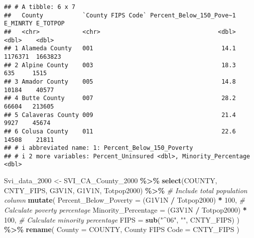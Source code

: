 \documentclass[
]{article}
\newenvironment{Shaded}{\begin{snugshade}}{\end{snugshade}}
\newcommand{\AttributeTok}[1]{\textcolor[rgb]{0.13,0.29,0.53}{#1}}
\newcommand{\CommentTok}[1]{\textcolor[rgb]{0.56,0.35,0.01}{\textit{#1}}}
\newcommand{\DecValTok}[1]{\textcolor[rgb]{0.00,0.00,0.81}{#1}}
\newcommand{\FunctionTok}[1]{\textcolor[rgb]{0.13,0.29,0.53}{\textbf{#1}}}
\newcommand{\NormalTok}[1]{#1}
\newcommand{\OtherTok}[1]{\textcolor[rgb]{0.56,0.35,0.01}{#1}}
\newcommand{\SpecialCharTok}[1]{\textcolor[rgb]{0.81,0.36,0.00}{\textbf{#1}}}
\newcommand{\StringTok}[1]{\textcolor[rgb]{0.31,0.60,0.02}{#1}}
\begin{document}
\begin{verbatim}
## # A tibble: 6 x 7
##   County           `County FIPS Code` Percent_Below_150_Pove~1 E_MINRTY E_TOTPOP
##   <chr>            <chr>                                 <dbl>    <dbl>    <dbl>
## 1 Alameda County   001                                    14.1  1176371  1663823
## 2 Alpine County    003                                    18.3      635     1515
## 3 Amador County    005                                    14.8    10184    40577
## 4 Butte County     007                                    28.2    66604   213605
## 5 Calaveras County 009                                    21.4     9927    45674
## 6 Colusa County    011                                    22.6    14508    21811
## # i abbreviated name: 1: Percent_Below_150_Poverty
## # i 2 more variables: Percent_Uninsured <dbl>, Minority_Percentage <dbl>
\end{verbatim}

\begin{Shaded}
\begin{Highlighting}[]
\NormalTok{Svi\_data\_2000 }\OtherTok{\textless{}{-}}\NormalTok{ SVI\_CA\_County\_2000 }\SpecialCharTok{\%\textgreater{}\%} 
  \FunctionTok{select}\NormalTok{(COUNTY, CNTY\_FIPS, G3V1N, G1V1N, Totpop2000) }\SpecialCharTok{\%\textgreater{}\%} \CommentTok{\# Include total population column}
  \FunctionTok{mutate}\NormalTok{(}
    \AttributeTok{Percent\_Below\_Poverty =}\NormalTok{ (G1V1N }\SpecialCharTok{/}\NormalTok{ Totpop2000) }\SpecialCharTok{*} \DecValTok{100}\NormalTok{, }\CommentTok{\# Calculate poverty percentage}
    \AttributeTok{Minority\_Percentage =}\NormalTok{ (G3V1N }\SpecialCharTok{/}\NormalTok{ Totpop2000) }\SpecialCharTok{*} \DecValTok{100}\NormalTok{,  }\CommentTok{\# Calculate minority percentage}
    \AttributeTok{FIPS =} \FunctionTok{sub}\NormalTok{(}\StringTok{"\^{}06"}\NormalTok{, }\StringTok{""}\NormalTok{, CNTY\_FIPS)}
\NormalTok{  ) }\SpecialCharTok{\%\textgreater{}\%}
  \FunctionTok{rename}\NormalTok{(}
    \AttributeTok{County =}\NormalTok{ COUNTY,}
    \StringTok{\textasciigrave{}}\AttributeTok{County FIPS Code}\StringTok{\textasciigrave{}} \OtherTok{=}\NormalTok{ CNTY\_FIPS}
\NormalTok{  )}
\end{Highlighting}
\end{Shaded}
\end{document}
